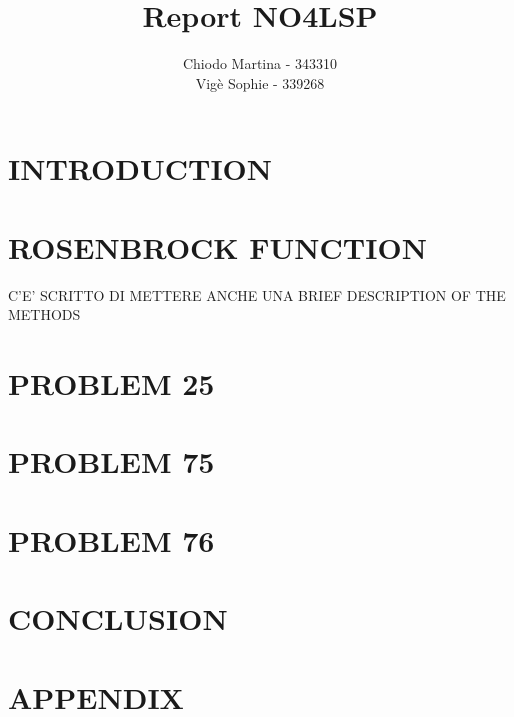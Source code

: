 \documentclass{article}
\title{Report NO4LSP}
\author{Chiodo Martina - 343310 \\ Vigè Sophie - 339268}
\date{}
\begin{document}
%



\section*{INTRODUCTION}


\clearpage
\section*{ROSENBROCK FUNCTION}


\clearpage
C'E' SCRITTO DI METTERE ANCHE UNA BRIEF DESCRIPTION OF THE METHODS

\clearpage
\section*{PROBLEM 25}


\clearpage
\section*{PROBLEM 75}


\clearpage
\section*{PROBLEM 76}


\clearpage
\section*{CONCLUSION}


\clearpage
\section*{APPENDIX}

\end{document}
